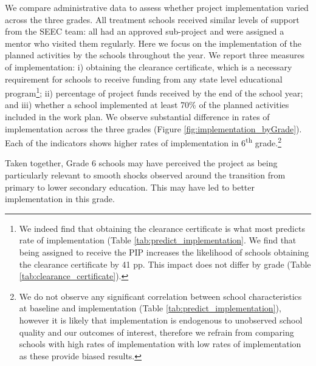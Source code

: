 \documentclass[11pt,a4paper]{article}
\begin{document}
	We compare administrative data to assess whether project implementation varied across the three grades. All treatment schools received similar levels of support from the SEEC team: all had an approved sub-project and were assigned a mentor who visited them regularly. Here we focus on the implementation of the planned activities by the schools throughout the year. We report three measures of implementation: i) obtaining the clearance certificate, which is a necessary requirement for schools to receive funding from any state level educational program\footnote{We indeed find that obtaining the clearance certificate is what most predicts rate of implementation (Table \ref{tab:predict_implementation}. We find that being assigned to receive the PIP increases the likelihood of schools obtaining the clearance certificate by 41 pp. This impact does not differ by grade (Table \ref{tab:clearance_certificate}).}; ii) percentage of project funds received by the end of the school year; and iii) whether a school implemented at least 70\% of the planned activities included in the work plan. We observe substantial difference in rates of implementation across the three grades (Figure \ref{fig:implementation_byGrade}). Each of the indicators shows higher rates of implementation in 6\textsuperscript{th} grade.\footnote{We do not observe any significant correlation between school characteristics at baseline and implementation (Table \ref{tab:predict_implementation}), however it is likely that implementation is endogenous to unobserved school quality and our outcomes of interest, therefore we refrain from comparing schools with high rates of implementation with low rates of implementation as these provide biased results.} 
	
	Taken together, Grade 6 schools may have perceived the project as being particularly relevant to smooth shocks observed around the transition from primary to lower secondary education. This may have led to better implementation in this grade. 
	
\end{document}
